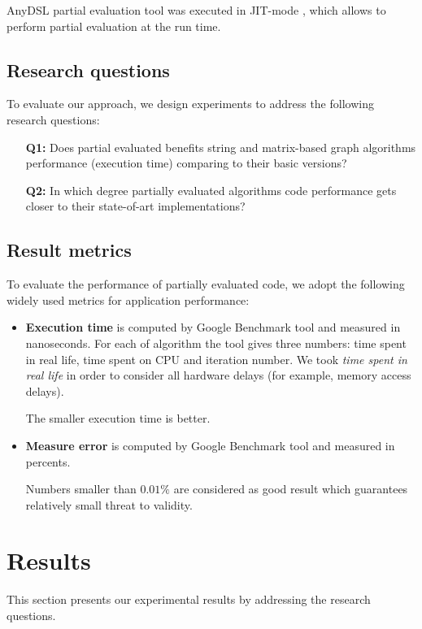 \documentclass[conference]{IEEEtran}
\begin{document}
AnyDSL partial evaluation tool was executed in JIT-mode \colorbox{red}{\cite{leissa2018anydsl}}, which allows to perform partial evaluation at the run time.



\subsection{Research questions}

To evaluate our approach, we design experiments to address the following research questions:

\begin{itemize}
	\item[\textbf{Q1:}] Does partial evaluated benefits string and matrix-based graph algorithms performance (execution time) comparing to their basic versions?
	\item[\textbf{Q2:}] In which degree partially evaluated algorithms code performance gets closer to their state-of-art implementations?
\end{itemize}

\subsection{Result metrics}
To evaluate the performance of partially evaluated code, we adopt the following widely used metrics for application performance:
\begin{itemize}
	\item \textbf{Execution time} is computed by Google Benchmark tool and measured in nanoseconds. For each of algorithm the tool gives three numbers: time spent in real life, time spent on CPU and iteration number. We took \textit{time spent in real life} in order to consider all hardware delays (for example, memory access delays).
	
	The smaller execution time is better.
	
	\item \textbf{Measure error} is computed by Google Benchmark tool and measured in percents. 
	
	Numbers smaller than $0.01\%$ are considered as good result which guarantees relatively small threat to validity.

\end{itemize}

\section{Results}
This section presents our experimental results by addressing the research questions.
\end{document}
